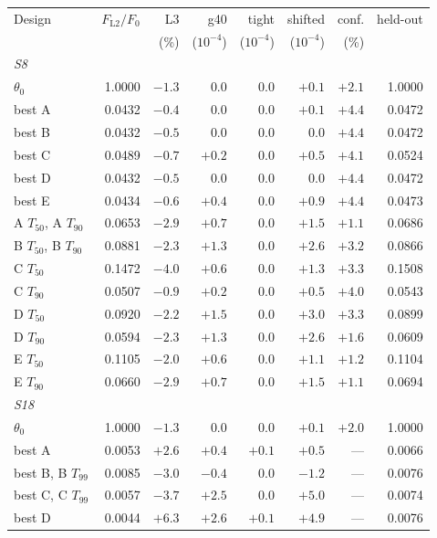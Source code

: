\begin{tabular}{lrrrrrrr}\toprule
Design & $F_{\mathrm{L2}}/F_0$ & L3 & g40 & tight & shifted & conf. & held-out\\
 & & (\%) & ($10^{-4}$) & ($10^{-4}$) & ($10^{-4}$) & (\%) & \\\midrule
\multicolumn{8}{l}{\emph{S8}}\\
$\theta_0$ & 1.0000 & $-1.3$ & $0.0$ & $0.0$ & $+0.1$ & $+2.1$ & 1.0000\\
best A & 0.0432 & $-0.4$ & $0.0$ & $0.0$ & $+0.1$ & $+4.4$ & 0.0472\\
best B & 0.0432 & $-0.5$ & $0.0$ & $0.0$ & $0.0$ & $+4.4$ & 0.0472\\
best C & 0.0489 & $-0.7$ & $+0.2$ & $0.0$ & $+0.5$ & $+4.1$ & 0.0524\\
best D & 0.0432 & $-0.5$ & $0.0$ & $0.0$ & $0.0$ & $+4.4$ & 0.0472\\
best E & 0.0434 & $-0.6$ & $+0.4$ & $0.0$ & $+0.9$ & $+4.4$ & 0.0473\\
A $T_{50}$, A $T_{90}$ & 0.0653 & $-2.9$ & $+0.7$ & $0.0$ & $+1.5$ & $+1.1$ & 0.0686\\
B $T_{50}$, B $T_{90}$ & 0.0881 & $-2.3$ & $+1.3$ & $0.0$ & $+2.6$ & $+3.2$ & 0.0866\\
C $T_{50}$ & 0.1472 & $-4.0$ & $+0.6$ & $0.0$ & $+1.3$ & $+3.3$ & 0.1508\\
C $T_{90}$ & 0.0507 & $-0.9$ & $+0.2$ & $0.0$ & $+0.5$ & $+4.0$ & 0.0543\\
D $T_{50}$ & 0.0920 & $-2.2$ & $+1.5$ & $0.0$ & $+3.0$ & $+3.3$ & 0.0899\\
D $T_{90}$ & 0.0594 & $-2.3$ & $+1.3$ & $0.0$ & $+2.6$ & $+1.6$ & 0.0609\\
E $T_{50}$ & 0.1105 & $-2.0$ & $+0.6$ & $0.0$ & $+1.1$ & $+1.2$ & 0.1104\\
E $T_{90}$ & 0.0660 & $-2.9$ & $+0.7$ & $0.0$ & $+1.5$ & $+1.1$ & 0.0694\\
\multicolumn{8}{l}{\emph{S18}}\\
$\theta_0$ & 1.0000 & $-1.3$ & $0.0$ & $0.0$ & $+0.1$ & $+2.0$ & 1.0000\\
best A & 0.0053 & $+2.6$ & $+0.4$ & $+0.1$ & $+0.5$ & --- & 0.0066\\
best B, B $T_{99}$ & 0.0085 & $-3.0$ & $-0.4$ & $0.0$ & $-1.2$ & --- & 0.0076\\
best C, C $T_{99}$ & 0.0057 & $-3.7$ & $+2.5$ & $0.0$ & $+5.0$ & --- & 0.0074\\
best D & 0.0044 & $+6.3$ & $+2.6$ & $+0.1$ & $+4.9$ & --- & 0.0076\\

\end{tabular}
